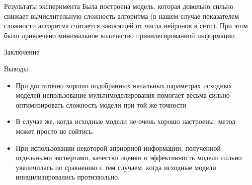 \documentclass{beamer}
\begin{document}
\begin{frame}{Результаты эксперимента}
Была построена модель, которая довольно сильно снижает вычислительную сложность алгоритма (в нашем случае показателем сложности алгоритма считается зависящей от числа нейронов в сети). При этом было привлечено минимальное количество привилегированной информации. 
\end{frame}


\begin{frame}{Заключение}
\begin{block}{Выводы:}
\begin{itemize}
  \item При достаточно хорошо подобранных начальных параметрах исходных моделей использование мультимоделирования помогает весьма сильно оптимизировать сложность модели при той же точности

  \item В случае же, когда исходные модели не очень хорошо настроены, метод может просто не сойтись.

\item При использовании некоторой априорной  информации, полученной отдельными экспертами,  качество оценки и эффективность модели сильно увеличилась по сравнению с тем случаем, когда исходные модели иницилизировались протизвольно.

\end{itemize}
\end{block}
\end{frame}
\end{document}
